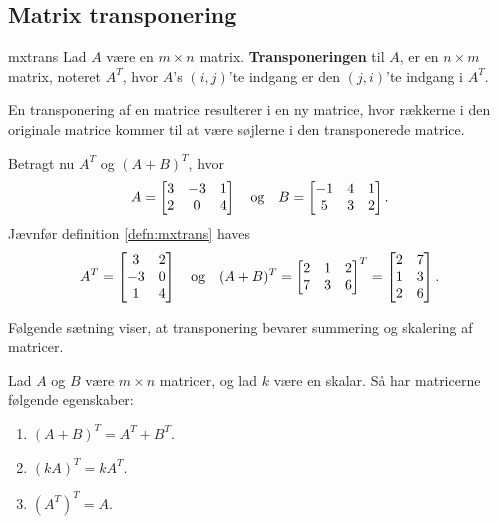 \subsection{Matrix transponering}
\begin{defn}{}{mxtrans}
Lad $A$ være en $m \times n$ matrix. \textbf{Transponeringen} til $A$, er en $n \times m$ matrix, noteret $A^T$, hvor $A$'s $(i,j)$'te indgang er den $(j,i)$'te indgang i $A^T$.
\end{defn}
\noindent
En transponering af en matrice resulterer i en ny matrice, hvor rækkerne i den originale matrice kommer til at være søjlerne i den transponerede matrice.

\begin{eks}\label{eks:trans}
Betragt nu $A^T$ og $(A+B)^T$, hvor 
\begin{align*}
A= 
\begin{bmatrix}
3	&	-3	&	1\\
2	&	0	&	4
\end{bmatrix}
\text{\phantom{---}og\phantom{---}}
B= 
\begin{bmatrix}
-1	&	4	&	1\\
5	&	3	&	2
\end{bmatrix}.
\end{align*}
Jævnfør definition \ref{defn:mxtrans} haves
\begin{align*}
A^T =
\begin{bmatrix}
3	&	2\\
-3	&	0\\
1	&	4
\end{bmatrix}
\text{\phantom{---}og\phantom{---}}
(A+B)^T=
\begin{bmatrix}
2	&	1	&	2\\
7	&	3	&	6
\end{bmatrix}^T
=
\begin{bmatrix}
2	&	7\\
1	&	3\\
2	&	6
\end{bmatrix}.
\end{align*}
\end{eks}
%
Følgende sætning viser, at transponering bevarer summering og skalering af matricer.
\begin{thm}{}{}
Lad $A$ og $B$ være $m \times n$ matricer, og lad $k$ være en skalar.
Så har matricerne følgende egenskaber:
\begin{enumerate}[label=(\alph*)]
\item $(A + B)^T = A^T + B^T$.
\item $(kA)^T = kA^T$.
\item $(A^T)^T = A$.
\end{enumerate}
\end{thm}

